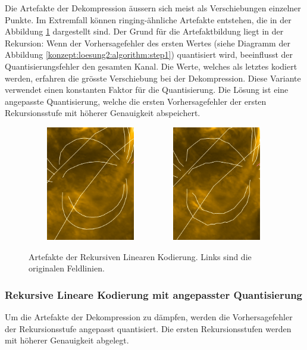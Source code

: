 Die Artefakte der Dekompression äussern sich meist als Verschiebungen einzelner Punkte. Im Extremfall können ringing-ähnliche Artefakte entstehen, die in der Abbildung \ref{resultate:loesung2:adaptive:median:artefakte} dargestellt sind. Der Grund für die Artefaktbildung liegt in der Rekursion: Wenn der Vorhersagefehler des ersten Wertes (siehe Diagramm der Abbildung \ref{konzept:loesung2:algorithm:step1}) quantisiert wird, beeinflusst der Quantisierungsfehler den gesamten Kanal. Die Werte, welches als letztes kodiert werden, erfahren die grösste Verschiebung bei der Dekompression. Diese Variante verwendet einen konstanten Faktor für die Quantisierung. Die Lösung ist eine angepasste Quantisierung, welche die ersten Vorhersagefehler der ersten Rekursionsstufe mit höherer Genauigkeit abspeichert.

\begin{figure}[!htbp]
	\center
		\includegraphics[width=0.49\textwidth,height=5cm,keepaspectratio]{./pictures/resultate/loesung2/variante3/no_artifacts.png}
	\includegraphics[width=0.49\textwidth,height=5cm,keepaspectratio]{./pictures/resultate/loesung2/variante3/artifacts_8.png}
	\caption{Artefakte der Rekursiven Linearen Kodierung. Links sind die originalen Feldlinien.}
	\label{resultate:loesung2:adaptive:median:artefakte}
\end{figure}

\subsubsection{Rekursive Lineare Kodierung mit angepasster Quantisierung}
Um die Artefakte der Dekompression zu dämpfen, werden die Vorhersagefehler der Rekursionsstufe angepasst quantisiert. Die ersten Rekursionsstufen werden mit höherer Genauigkeit abgelegt.

